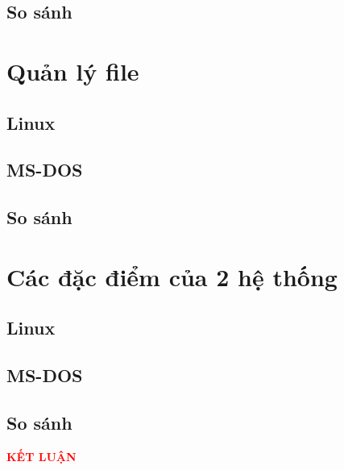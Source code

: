 \documentclass[12pt,a4paper]{article}
\begin{document}
\subsection{So sánh}
\section{Quản lý file}
\subsection{Linux}
\subsection{MS-DOS}
\subsection{So sánh}
\section{Các đặc điểm của 2 hệ thống}
\subsection{Linux}
\subsection{MS-DOS}
\subsection{So sánh}

\newpage
{}
\begin{center}
	{\fontsize{30}{14}\selectfont \textbf{\textcolor{red}{KẾT LUẬN}}}
\end{center}




	
	
	
\end{document}
